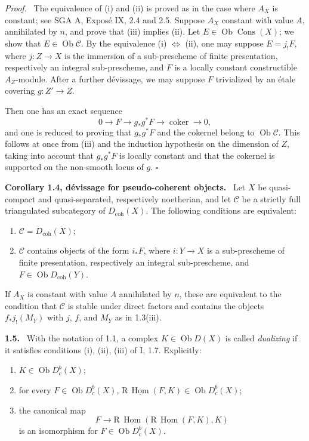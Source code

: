 \documentclass[12pt]{article}
\newcommand{\Hom}{\operatorname{Hom}}
\newcommand{\ob}{\operatorname{Ob}}
\newcommand{\R}{\mathrm R}
\newcommand{\cC}{\mathcal C}
\newcommand{\qedtext}{\hfill$\square$}
\newenvironment{statement}[1]{\par\medskip\noindent\textbf{#1.}\ }{\par\medskip}
\newenvironment{prooftext}[1][Proof]{\par\noindent\emph{#1.}\ }{\par\medskip}
\begin{document}
\begin{prooftext}
The equivalence of (i) and (ii) is proved as in the case where $A_X$ is constant; see SGA A, Exposé IX, 2.4 and 2.5. Suppose $A_X$ constant with value $A$, annihilated by $n$, and prove that (iii) implies (ii). Let $E\in\ob\operatorname{Cons}(X)$; we show that $E\in\ob\cC$. By the equivalence (i) $\Leftrightarrow$ (ii), one may suppose $E=j_!F$, where $j:Z\to X$ is the immersion of a sub-prescheme of finite presentation, respectively an integral sub-prescheme, and $F$ is a locally constant constructible $A_Z$-module. After a further dévissage, we may suppose $F$ trivialized by an étale covering $g:Z'\to Z$.

Then one has an exact sequence
\[
   0\to F\to g_*g^*F\to\operatorname{coker}\to0,
\]
and one is reduced to proving that $g_*g^*F$ and the cokernel belong to $\ob\cC$. This follows at once from (iii) and the induction hypothesis on the dimension of $Z$, taking into account that $g_*g^*F$ is locally constant and that the cokernel is supported on the non-smooth locus of $g$. \qedtext
\end{prooftext}

\begin{statement}{Corollary 1.4, dévissage for pseudo-coherent objects}
Let $X$ be quasi-compact and quasi-separated, respectively noetherian, and let $\cC$ be a strictly full triangulated subcategory of $D_{\mathrm{coh}}(X)$. The following conditions are equivalent:
\begin{enumerate}[label=(\roman*)]
\item $\cC=D_{\mathrm{coh}}(X)$;
\item $\cC$ contains objects of the form $i_*F$, where $i:Y\to X$ is a sub-prescheme of finite presentation, respectively an integral sub-prescheme, and $F\in\ob D_{\mathrm{coh}}(Y)$.
\end{enumerate}
If $A_X$ is constant with value $A$ annihilated by $n$, these are equivalent to the condition that $\cC$ is stable under direct factors and contains the objects $f_*j_!(M_Y)$ with $j$, $f$, and $M_Y$ as in 1.3(iii).
\end{statement}

\begin{statement}{1.5}
With the notation of 1.1, a complex $K\in\ob D(X)$ is called \emph{dualizing} if it satisfies conditions (i), (ii), (iii) of I, 1.7. Explicitly:
\begin{enumerate}[label=(\roman*)]
\item $K\in\ob D_c^b(X)$;
\item for every $F\in\ob D_c^b(X)$, $\R\,\underline{\Hom}(F,K)\in\ob D_c^b(X)$;
\item the canonical map
\[
   F\longrightarrow \R\,\underline{\Hom}(\R\,\underline{\Hom}(F,K),K)
\]
is an isomorphism for $F\in\ob D_c^b(X)$.
\end{enumerate}
\end{statement}
\end{document}
